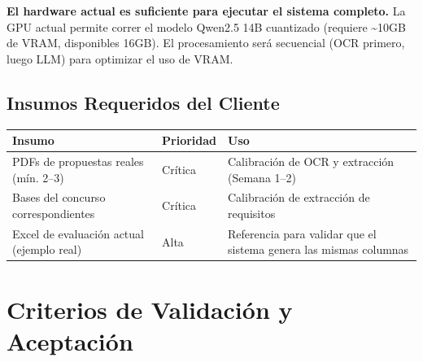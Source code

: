 \documentclass[11pt,a4paper]{article}
\begin{document}
\textbf{El hardware actual es suficiente para ejecutar el sistema completo.} La GPU actual permite correr el modelo Qwen2.5 14B cuantizado (requiere \textasciitilde10GB de VRAM, disponibles 16GB). El procesamiento será secuencial (OCR primero, luego LLM) para optimizar el uso de VRAM.

\subsection{Insumos Requeridos del Cliente}

\begin{center}
\begin{tabular}{|>{\raggedright\arraybackslash}m{5.5cm}|>{\centering\arraybackslash}m{1.5cm}|>{\raggedright\arraybackslash}m{5.5cm}|}
\hline
\textbf{Insumo} & \textbf{Prioridad} & \textbf{Uso} \\
\hline
PDFs de propuestas reales (mín. 2--3) & Crítica & Calibración de OCR y extracción (Semana 1--2) \\
\hline
Bases del concurso correspondientes & Crítica & Calibración de extracción de requisitos \\
\hline
Excel de evaluación actual (ejemplo real) & Alta & Referencia para validar que el sistema genera las mismas columnas \\
\hline
\end{tabular}
\end{center}

\section{Criterios de Validación y Aceptación}
\end{document}
